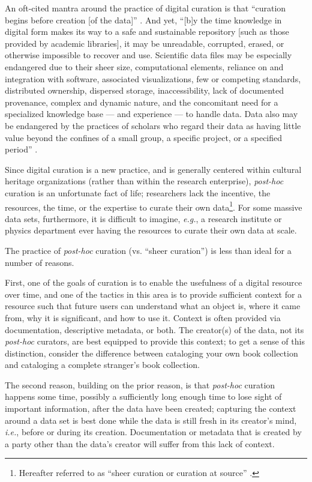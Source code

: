 \documentclass{acm_proc_article-sp}
\begin{document}
An oft-cited mantra around the practice of digital curation is that
``curation begins before creation [of the data]''
\cite{rusbridge:curation}. And yet, ``[b]y the time knowledge in
digital form makes its way to a safe and sustainable repository [such
as those provided by academic libraries], it may be unreadable,
corrupted, erased, or otherwise impossible to recover and
use. Scientific data files may be especially endangered due to their
sheer size, computational elements, reliance on and integration with
software, associated visualizations, few or competing standards,
distributed ownership, dispersed storage, inaccessibility, lack of
documented provenance, complex and dynamic nature, and the concomitant
need for a specialized knowledge base --- and experience --- to handle
data.  Data also may be endangered by the practices of scholars who
regard their data as having little value beyond the confines of a
small group, a specific project, or a specified period''
\cite{ogburn:imperative}.

Since digital curation is a new practice, and is generally centered
within cultural heritage organizations (rather than within the
research enterprise), \textit{post-hoc} curation is an unfortunate
fact of life; researchers lack the incentive, the resources, the time,
or the expertise to curate their own data\footnote{Hereafter referred
  to as ``sheer curation or curation at source''
  \cite{curry:community}.}. For some massive data sets, furthermore,
it is difficult to imagine, \textit{e.g.}, a research institute or
physics department ever having the resources to curate their own data
at scale.

The practice of \textit{post-hoc} curation (vs. ``sheer curation'') is
less than ideal for a number of reasons.

First, one of the goals of curation is to enable the usefulness of a
digital resource over time, and one of the tactics in this area is to
provide sufficient context for a resource such that future users can
understand what an object is, where it came from, why it is
significant, and how to use it. Context is often provided via
documentation, descriptive metadata, or
both\cite{arl:stewardship,heidorn:libraries,curry:community,jisc:deluge}. The
creator(s) of the data, not its \textit{post-hoc} curators, are best
equipped to provide this context; to get a sense of this distinction,
consider the difference between cataloging your own book collection
and cataloging a complete stranger's book collection.

The second reason, building on the prior reason, is that
\textit{post-hoc} curation happens some time, possibly a sufficiently
long enough time to lose sight of important information, after the
data have been created; capturing the context around a data set is
best done while the data is still fresh in its creator's mind,
\textit{i.e.}, before or during its creation. Documentation or
metadata that is created by a party other than the data's creator will
suffer from this lack of context.
\end{document}
